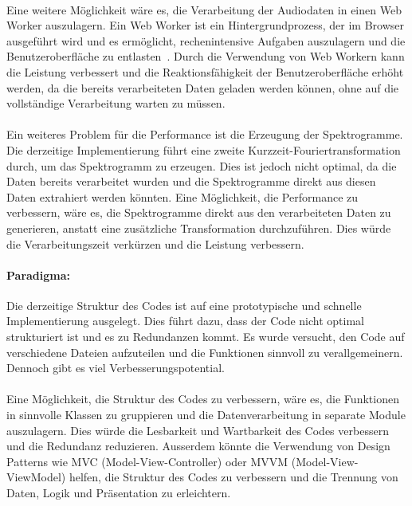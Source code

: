 \paragraph{}
Eine weitere Möglichkeit wäre es, die Verarbeitung der Audiodaten in einen Web Worker auszulagern. Ein Web Worker ist ein Hintergrundprozess, der im Browser ausgeführt wird und es ermöglicht, rechenintensive Aufgaben auszulagern und die Benutzeroberfläche zu entlasten~\cite{mdn_web_workers}. Durch die Verwendung von Web Workern kann die Leistung verbessert und die Reaktionsfähigkeit der Benutzeroberfläche erhöht werden, da die bereits verarbeiteten Daten geladen werden können, ohne auf die vollständige Verarbeitung warten zu müssen.

\paragraph{}
Ein weiteres Problem für die Performance ist die Erzeugung der Spektrogramme. Die derzeitige Implementierung führt eine zweite Kurzzeit-Fouriertransformation durch, um das Spektrogramm zu erzeugen. Dies ist jedoch nicht optimal, da die Daten bereits verarbeitet wurden und die Spektrogramme direkt aus diesen Daten extrahiert werden könnten. Eine Möglichkeit, die Performance zu verbessern, wäre es, die Spektrogramme direkt aus den verarbeiteten Daten zu generieren, anstatt eine zusätzliche Transformation durchzuführen. Dies würde die Verarbeitungszeit verkürzen und die Leistung verbessern.

\paragraph{Paradigma:}
Die derzeitige Struktur des Codes ist auf eine prototypische und schnelle Implementierung ausgelegt. Dies führt dazu, dass der Code nicht optimal strukturiert ist und es zu Redundanzen kommt. Es wurde versucht, den Code auf verschiedene Dateien aufzuteilen und die Funktionen sinnvoll zu verallgemeinern. Dennoch gibt es viel Verbesserungspotential.

\paragraph{}
Eine Möglichkeit, die Struktur des Codes zu verbessern, wäre es, die Funktionen in sinnvolle Klassen zu gruppieren und die Datenverarbeitung in separate Module auszulagern. Dies würde die Lesbarkeit und Wartbarkeit des Codes verbessern und die Redundanz reduzieren. Ausserdem könnte die Verwendung von Design Patterns wie MVC (Model-View-Controller) oder MVVM (Model-View-ViewModel) helfen, die Struktur des Codes zu verbessern und die Trennung von Daten, Logik und Präsentation zu erleichtern.

